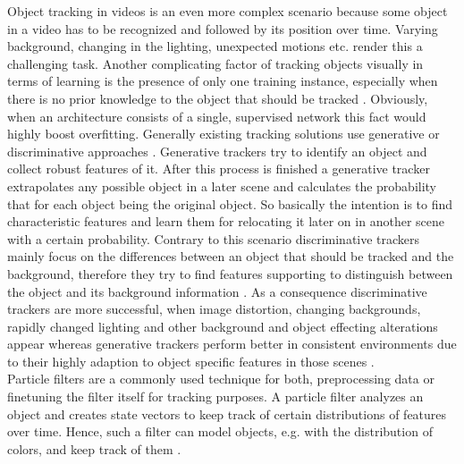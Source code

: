 \documentclass[12pt,twoside]{article}
\theoremstyle{plain}
\theoremstyle{definition}
\theoremstyle{remark}
\begin{document}
Object tracking in videos is an even more complex scenario because some object in a video has to be recognized and followed by its position over time. Varying background, changing in the lighting, unexpected motions etc. render this a challenging task.
Another complicating factor of tracking objects visually in terms of learning is the presence of only one training instance, especially when there is no prior knowledge to the object that should be tracked \cite{LearningDeepCompactImageTracking-Wang}. Obviously, when an architecture consists of a single, supervised network this fact would highly boost overfitting.
Generally existing tracking solutions use generative or discriminative approaches \cite{GenerativeDiscriminativeTrackerBook}. Generative trackers try to identify an object and collect robust features of it. After this process is finished a generative tracker extrapolates any possible object in a later scene and calculates the probability that for each object being the original object. So basically the intention is to find characteristic features and learn them for relocating it later on in another scene with a certain probability.
Contrary to this scenario discriminative trackers mainly focus on the differences between an object that should be tracked and the background, therefore they try to find features supporting to distinguish between the object and its background information \cite{GenerativeDiscriminativeTrackerBook}.
As a consequence discriminative trackers are more successful, when image distortion, changing backgrounds, rapidly changed lighting and other background and object effecting alterations appear whereas generative trackers perform better in consistent environments due to their highly adaption to object specific features in those scenes \cite{GenerativeDiscriminativePerformanceBenchmark}.
\\
Particle filters are a commonly used technique for both, preprocessing data or finetuning the filter itself for tracking purposes. A particle filter analyzes an object and creates state vectors to keep track of certain distributions of features over time. Hence, such a filter can model objects, e.g. with the distribution of colors, and keep track of them \cite{ParticleFilterObjectTracking}. 
\end{document}
